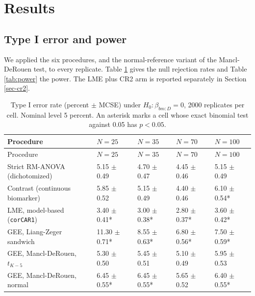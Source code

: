 \documentclass[
  11pt,
]{article}
\begin{document}
\section{Results}\label{sec-results}

\subsection{Type I error and power}\label{type-i-error-and-power}

We applied the six procedures, and the normal-reference variant of
the Mancl-DeRouen test, to every replicate. Table \ref{tab:type1}
gives the null rejection rates and Table \ref{tab:power} the power.
The LME plus CR2 arm is reported separately in Section
\ref{sec-cr2}.

\begin{longtable}[]{@{}lllll@{}}
\caption{\label{tab:type1} Type I error rate (percent \(\pm\) MCSE) under \(H_0: \beta_{bm:D} = 0\), 2000 replicates per cell. Nominal level 5 percent. An asterisk marks a cell whose exact binomial test against 0.05 has \(p < 0.05\).}\tabularnewline
\toprule\noalign{}
Procedure & \(N = 25\) & \(N = 35\) & \(N = 70\) & \(N = 100\) \\
\midrule\noalign{}
\endfirsthead
\toprule\noalign{}
Procedure & \(N = 25\) & \(N = 35\) & \(N = 70\) & \(N = 100\) \\
\midrule\noalign{}
\endhead
\bottomrule\noalign{}
\endlastfoot
Strict RM-ANOVA (dichotomized) & 5.15 \(\pm\) 0.49 & 4.70 \(\pm\) 0.47 & 4.45 \(\pm\) 0.46 & 5.15 \(\pm\) 0.49 \\
Contrast (continuous biomarker) & 5.85 \(\pm\) 0.52 & 5.15 \(\pm\) 0.49 & 4.40 \(\pm\) 0.46 & 6.10 \(\pm\) 0.54* \\
LME, model-based (\texttt{corCAR1}) & 3.40 \(\pm\) 0.41* & 3.00 \(\pm\) 0.38* & 2.80 \(\pm\) 0.37* & 3.60 \(\pm\) 0.42* \\
GEE, Liang-Zeger sandwich & 11.30 \(\pm\) 0.71* & 8.55 \(\pm\) 0.63* & 6.80 \(\pm\) 0.56* & 7.50 \(\pm\) 0.59* \\
GEE, Mancl-DeRouen, \(t_{K-5}\) & 5.30 \(\pm\) 0.50 & 5.45 \(\pm\) 0.51 & 5.10 \(\pm\) 0.49 & 5.95 \(\pm\) 0.53 \\
GEE, Mancl-DeRouen, normal & 6.45 \(\pm\) 0.55* & 6.45 \(\pm\) 0.55* & 5.65 \(\pm\) 0.52 & 6.40 \(\pm\) 0.55* \\
\end{longtable}
\end{document}

